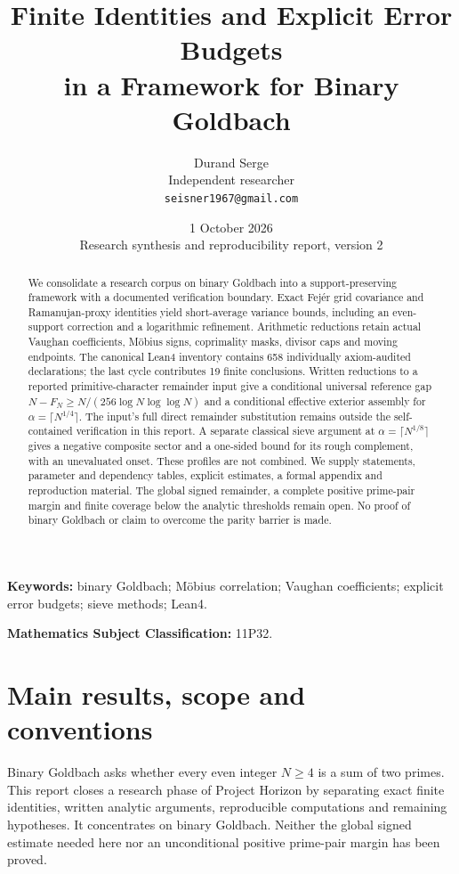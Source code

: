 \documentclass[11pt,a4paper]{article}
\title{Finite Identities and Explicit Error Budgets\\
in a Framework for Binary Goldbach}
\author{Durand Serge\\\small Independent researcher\\\small\texttt{seisner1967@gmail.com}}
\date{1 October 2026\\[4pt]\small Research synthesis and reproducibility report, version 2}
\theoremstyle{definition}
\theoremstyle{remark}
\begin{document}
\maketitle
\begin{abstract}
We consolidate a research corpus on binary Goldbach into a support-preserving framework with a documented verification boundary. Exact Fej\'er grid covariance and Ramanujan-proxy identities yield short-average variance bounds, including an even-support correction and a logarithmic refinement. Arithmetic reductions retain actual Vaughan coefficients, M\"obius signs, coprimality masks, divisor caps and moving endpoints. The canonical Lean4 inventory contains 658 individually axiom-audited declarations; the last cycle contributes 19 finite conclusions. Written reductions to a reported primitive-character remainder input give a conditional universal reference gap $N-F_N\ge N/(256\log N\log\log N)$ and a conditional effective exterior assembly for $\alpha=\lceil N^{1/4}\rceil$. The input's full direct remainder substitution remains outside the self-contained verification in this report. A separate classical sieve argument at $\alpha=\lceil N^{1/8}\rceil$ gives a negative composite sector and a one-sided bound for its rough complement, with an unevaluated onset. These profiles are not combined. We supply statements, parameter and dependency tables, explicit estimates, a formal appendix and reproduction material. The global signed remainder, a complete positive prime-pair margin and finite coverage below the analytic thresholds remain open. No proof of binary Goldbach or claim to overcome the parity barrier is made.
\end{abstract}
\noindent\textbf{Keywords:} binary Goldbach; M\"obius correlation; Vaughan coefficients; explicit error budgets; sieve methods; Lean4.
\par\noindent\textbf{Mathematics Subject Classification:} 11P32.
\par{}
\clearpage
\tableofcontents
\clearpage


\section{Main results, scope and conventions}\label{sec:scope}
Binary Goldbach asks whether every even integer $N\ge4$ is a sum of two primes. This report closes a research phase of Project Horizon by separating exact finite identities, written analytic arguments, reproducible computations and remaining hypotheses. It concentrates on binary Goldbach. Neither the global signed estimate needed here nor an unconditional positive prime-pair margin has been proved.
\end{document}
